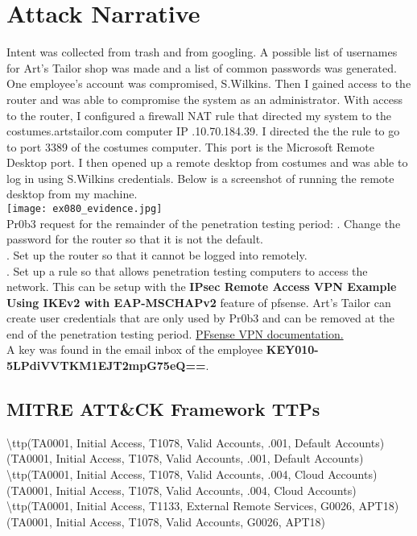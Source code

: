 \documentclass[notitlepage]{article}
\begin{document}
	\section{Attack Narrative}
	
	\indent Intent was collected from trash and from googling. A possible list of usernames for Art's Tailor shop was made and a list of common passwords was generated.  One employee's account was compromised, S.Wilkins. Then I gained access to the router and was able to compromise the system as an administrator.  With access to the router, I configured a firewall NAT rule that directed my system to the costumes.artstailor.com computer IP .10.70.184.39.  I directed the the rule to go to port 3389 of the costumes computer. This port is the Microsoft Remote Desktop port.  I then opened up a remote desktop from costumes and was able to log in using S.Wilkins credentials.  Below is a screenshot of running the remote desktop from my machine.  \\

  	\texttt{[image: ex080\_evidence.jpg]} \\
  	
  	\indent Pr0b3 request for the remainder of the penetration testing period:
  	. Change the password for the router so that it is not the default. \\
  	. Set up the router so that it cannot be logged into remotely.  \\
  	. Set up a rule so that allows penetration testing computers to access the network. This can be setup with the \textbf{IPsec Remote Access VPN Example Using IKEv2 with EAP-MSCHAPv2} feature of pfsense. Art's Tailor can create user credentials that are only used by Pr0b3 and can be removed at the end of the penetration testing period. 
  	\href{https://docs.netgate.com/pfsense/en/latest/recipes/ipsec-mobile-ikev2-eap-mschapv2.html#ipsec-remote-access-vpn-example-using-ikev2-with-eap-mschapv2}{PFsense VPN documentation.} \\
  	
  	
  	\indent A key was found in the email inbox of the employee \textbf{KEY010-5LPdiVVTKM1EJT2mpG75eQ==}. 
	
	\subsection{MITRE ATT{\&}CK Framework TTPs}
	
	\indent\textbackslash ttp(TA0001, Initial Access, T1078, Valid Accounts, .001, Default Accounts) \\
	\ttp(TA0001, Initial Access, T1078, Valid Accounts, .001, Default Accounts) \\
	\indent\textbackslash ttp(TA0001, Initial Access, T1078, Valid Accounts, .004, Cloud Accounts) \\
	\ttp(TA0001, Initial Access, T1078, Valid Accounts, .004, Cloud Accounts) \\
	\indent\textbackslash ttp(TA0001, Initial Access, T1133, External Remote Services, G0026, APT18) \\
	\ttp(TA0001, Initial Access, T1078, Valid Accounts, G0026, APT18) \\
\end{document}
